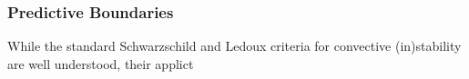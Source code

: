 {\color{brown}
\subsubsection{Predictive Boundaries}

While the standard Schwarzschild and Ledoux criteria for convective (in)stability are well understood, their applict

}